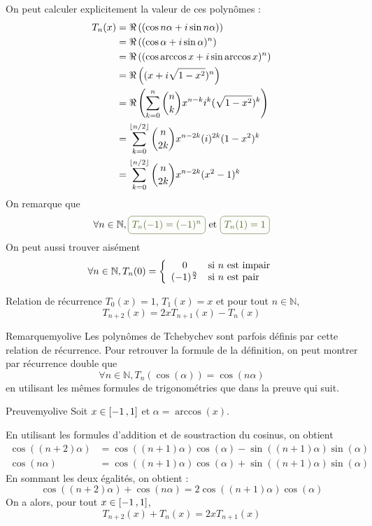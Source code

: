     On peut calculer explicitement la valeur de ces polynômes : 
    \begin{align*}
        T_n(x)&=\Re\left((\cos n\alpha +i\sin n\alpha)\right)\\
        &=\Re\left((\cos \alpha +i\sin \alpha)^n\right)\\
        &=\Re\left((\cos \arccos x +i\sin \arccos x)^n\right)\\
        &=\Re\left(( x +i\sqrt{1-x^2})^n\right)\\
        &=\Re\left(\sum_{k=0}^n \binom{n}{k} x^{n-k} i^{k}(\sqrt{1-x^2})^k\right)\\
        &=\sum_{k=0}^{\left\lfloor n/2 \right\rfloor} \binom{n}{2k} x^{n-2k} (i)^{2k}(1-x^2)^k\\
        &=\sum_{k=0}^{\left\lfloor n/2 \right\rfloor} \binom{n}{2k} x^{n-2k}(x^2-1)^k
        \end{align*}
    On remarque que \[ \forall n \in \mathbb{N}, \lilbox{myolive}{$T_n(-1) = (-1)^n$} \text{ et } \lilbox{myolive}{$T_n(1) = 1$} \] 
    On peut aussi trouver aisément \[ \forall n \in \mathbb{N}, T_n(0) = \sisi{0}{n \text{ est impair}}{(-1)^{\frac{n}{2}}}{n \text{ est pair}} \]

    \begin{prop}{Relation de récurrence}{}
        $T_0(x) = 1$, $T_1(x) = x$ et pour tout $n \in \mathbb{N}$,
        \[ T_{n+2}(x) = 2x T_{n+1}(x) - T_n(x) \]
    \end{prop}

    \begin{omed}{Remarque}{myolive}
        Les polynômes de Tchebychev sont parfois définis par cette relation de récurrence. Pour retrouver la formule de la définition, on peut montrer par récurrence double que \[ \forall n \in \mathbb{N}, T_n(\cos(\alpha)) = \cos(n \alpha) \] en utilisant les mêmes formules de trigonométries que dans la preuve qui suit.
    \end{omed}

    \begin{demo}{Preuve}{myolive}
        Soit $x \in \left[ -1 \, , 1 \right]$ et $\alpha = \arccos(x)$. 

        En utilisant les formules d’addition et de soustraction du cosinus, on obtient 
        \begin{align*}
            \cos((n+2)\alpha) &= \cos((n+1)\alpha)\cos(\alpha) - \sin((n+1)\alpha)\sin(\alpha) \\
            \cos(n\alpha) &= \cos((n+1)\alpha)\cos(\alpha) + \sin((n+1)\alpha)\sin(\alpha)
        \end{align*}
        En sommant les deux égalités, on obtient : 
        \[ \cos((n+2)\alpha) + \cos(n\alpha) = 2 \cos((n+1)\alpha) \cos(\alpha) \] 
        On a alors, pour tout $x \in \left[ -1 \, , 1 \right]$, 
        \[ T_{n+2}(x) + T_n(x) = 2x T_{n+1}(x) \] 
    \end{demo}

